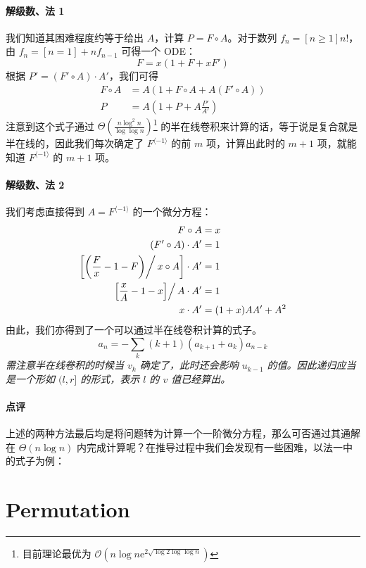 \documentclass[12pt]{ctexart}
\theoremstyle{theorem}
\theoremstyle{theorem}
\begin{document}
\paragraph{解级数、法 1} 我们知道其困难程度约等于给出 $A$，计算 $P = F\circ A$。对于数列 $f_n = [n\ge 1]n!$，由 $f_n = [n=1] + nf_{n-1}$ 可得一个 ODE：
$$
F = x(1 + F + xF')
$$
根据 $P' = (F'\circ A)\cdot A'$，我们可得
\begin{align*}
F\circ A &= A(1 + F\circ A + A(F'\circ A))\\
P &= A \left(1+ P + A \frac{P'}{A'}\right)
\end{align*}
注意到这个式子通过 $\Theta \left(\frac{n\log^2 n}{\log\log n}\right)$\footnote{目前理论最优为 $\mathcal O\left(n\log n\mathrm{e}^{2\sqrt{\log 2\log\log n}}\right)$} 的半在线卷积来计算的话，等于说是复合就是半在线的，因此我们每次确定了 $F^{\langle -1 \rangle}$ 的前 $m$ 项，计算出此时的 $m+1$ 项，就能知道 $F^{\langle -1 \rangle}$ 的 $m+1$ 项。

\paragraph{解级数、法 2} 我们考虑直接得到 $A = F^{\langle -1 \rangle}$ 的一个微分方程：
\begin{align*}
F\circ A &= x\\
(F'\circ A)\cdot A' &= 1\\
\left[\left(\frac Fx - 1-F\middle ) \right/ x\circ A\right]\cdot A' &= 1\\
\left[ \frac xA - 1 - x \middle]\right/ A \cdot A' &= 1\\
x\cdot A' &= (1+x)AA'+A^2
\end{align*}
由此，我们亦得到了一个可以通过半在线卷积计算的式子。
$$
a_n = -\sum_k (k+1)(a_{k+1}+a_k) a_{n-k}
$$
\emph{需注意半在线卷积的时候当 $v_k$ 确定了，此时还会影响 $u_{k-1}$ 的值。因此递归应当是一个形如 $(l, r]$ 的形式，表示 $l$ 的 $v$ 值已经算出。}

\paragraph{点评}

上述的两种方法最后均是将问题转为计算一个一阶微分方程，那么可否通过其通解在 $\Theta(n\log n)$ 内完成计算呢？在推导过程中我们会发现有一些困难，以法一中的式子为例：

\newpage

\section{Permutation}
\end{document}
